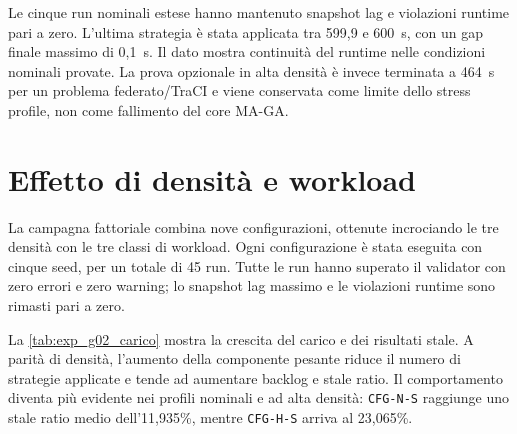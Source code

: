 Le cinque run nominali estese hanno mantenuto snapshot lag e violazioni runtime pari a zero. L'ultima strategia è stata applicata tra 599,9 e 600~s, con un gap finale massimo di 0,1~s. Il dato mostra continuità del runtime nelle condizioni nominali provate. La prova opzionale in alta densità è invece terminata a 464~s per un problema federato/TraCI e viene conservata come limite dello stress profile, non come fallimento del core MA-GA.

\section{Effetto di densità e workload}
\label{sec:exp_carico}

La campagna fattoriale combina nove configurazioni, ottenute incrociando le tre densità con le tre classi di workload. Ogni configurazione è stata eseguita con cinque seed, per un totale di 45 run. Tutte le run hanno superato il validator con zero errori e zero warning; lo snapshot lag massimo e le violazioni runtime sono rimasti pari a zero.

La \cref{tab:exp_g02_carico} mostra la crescita del carico e dei risultati stale. A parità di densità, l'aumento della componente pesante riduce il numero di strategie applicate e tende ad aumentare backlog e stale ratio. Il comportamento diventa più evidente nei profili nominali e ad alta densità: \texttt{CFG-N-S} raggiunge uno stale ratio medio dell'11,935\%, mentre \texttt{CFG-H-S} arriva al 23,065\%.

